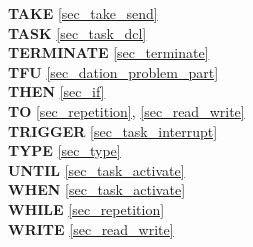 {{\bf TAKE} \ref{sec_take_send}\\
{\bf TASK} \ref{sec_task_dcl}\\
{\bf TERMINATE} \ref{sec_terminate}\\
{\bf TFU} \ref{sec_dation_problem_part}\\
{\bf THEN} \ref{sec_if}\\
{\bf TO} \ref{sec_repetition}, \ref{sec_read_write}\\
{\bf TRIGGER} \ref{sec_task_interrupt}\\
{\bf TYPE} \ref{sec_type}\\
 
{\bf UNTIL} \ref{sec_task_activate}\\
 
{\bf WHEN} \ref{sec_task_activate}\\
{\bf WHILE} \ref{sec_repetition}\\
{\bf WRITE} \ref{sec_read_write}\\
}
\onecolumn


